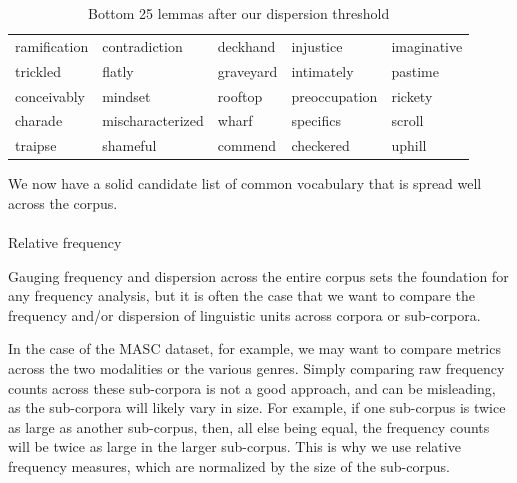 \documentclass[
  letterpaper,
  krantz1]{latex/krantz-mod}
\makeatletter
\let\oldparagraph\paragraph
\renewcommand{\paragraph}{
    \@ifstar
      \xxxParagraphStar
      \xxxParagraphNoStar
  }
\newcommand{\xxxParagraphStar}[1]{\oldparagraph*{#1}\mbox{}}
\newcommand{\xxxParagraphNoStar}[1]{\oldparagraph{#1}\mbox{}}
\theoremstyle{definition}
\theoremstyle{definition}
\theoremstyle{remark}
\makeatother
\begin{document}
\begin{longtable}[]{@{}
  >{\raggedright\arraybackslash}p{}
  >{\raggedright\arraybackslash}p{}
  >{\raggedright\arraybackslash}p{}
  >{\raggedright\arraybackslash}p{}
  >{\raggedright\arraybackslash}p{}@{}}

\caption{\label{tbl-explore-masc-dp-filter-preview-bottom}Bottom 25
lemmas after our dispersion threshold}

\tabularnewline

\toprule\noalign{}
\endhead
\bottomrule\noalign{}
\endlastfoot
ramification & contradiction & deckhand & injustice & imaginative \\
trickled & flatly & graveyard & intimately & pastime \\
conceivably & mindset & rooftop & preoccupation & rickety \\
charade & mischaracterized & wharf & specifics & scroll \\
traipse & shameful & commend & checkered & uphill \\

\end{longtable}

We now have a solid candidate list of common vocabulary that is spread
well across the corpus.

\pagebreak

\paragraph{Relative frequency}\label{sec-explore-frequency-relative}

\vspace{-1em}

Gauging frequency and dispersion across the entire corpus sets the
foundation for any frequency analysis, but it is often the case that we
want to compare the frequency and/or dispersion of linguistic units
across corpora or sub-corpora.

In the case of the MASC dataset, for example, we may want to compare
metrics across the two modalities or the various genres. Simply
comparing raw frequency counts across these
sub-corpora is not a good approach, and can be misleading, as the
sub-corpora will likely vary in size. For example, if one sub-corpus is
twice as large as another sub-corpus, then, all else being equal, the
frequency counts will be twice as large in the larger sub-corpus. This
is why we use relative frequency measures, which are normalized by the
size of the sub-corpus.
\end{document}
